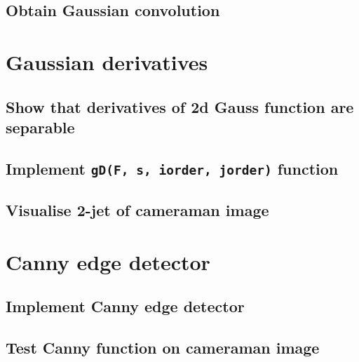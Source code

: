 \documentclass[abstract=true]{scrartcl}
\begin{document}
    \subsection{Obtain Gaussian convolution}


\section{Gaussian derivatives}

    \subsection{Show that derivatives of 2d Gauss function are separable}

    \subsection{Implement \texttt{gD(F, s, iorder, jorder)} function}

    \subsection{Visualise 2-jet of cameraman image}



\section{Canny edge detector}

    \subsection{Implement Canny edge detector}

    \subsection{Test Canny function on cameraman image}

\end{document}
